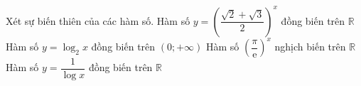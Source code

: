 \begin{ex}%
 Xét sự biến thiên của các  hàm số.
 \choiceTF 
  {\True Hàm số $y = \left(\dfrac{\sqrt{2} + \sqrt{3}}{2}\right)^x$ đồng  biến trên $\mathbb{R}$}
  {\True Hàm số $y=\log_2 x$ đồng biến trên  $(0;+\infty)$}
  {Hàm  số $\left(\dfrac{\pi}{\mathrm{e}}\right)^x$ nghịch biến trên $\mathbb{R}$}
  {Hàm số $y  = \dfrac{1}{\log x}$ đồng biến trên $\mathbb{R}$}
\end{ex}
